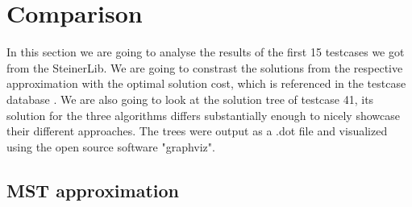 
\chapter{Comparison}\label{chapter:04_comparison}

In this section we are going to analyse the results of the first 15 testcases we got from the SteinerLib. We are going to constrast the solutions from the respective approximation with the optimal solution cost, which is referenced in the testcase database \cite{Dui93}. We are also going to look at the solution tree of testcase 41, its solution for the three algorithms differs substantially enough to nicely showcase their different approaches. The trees were output as a .dot file and visualized using the open source software "graphviz". 

\section{MST approximation}

